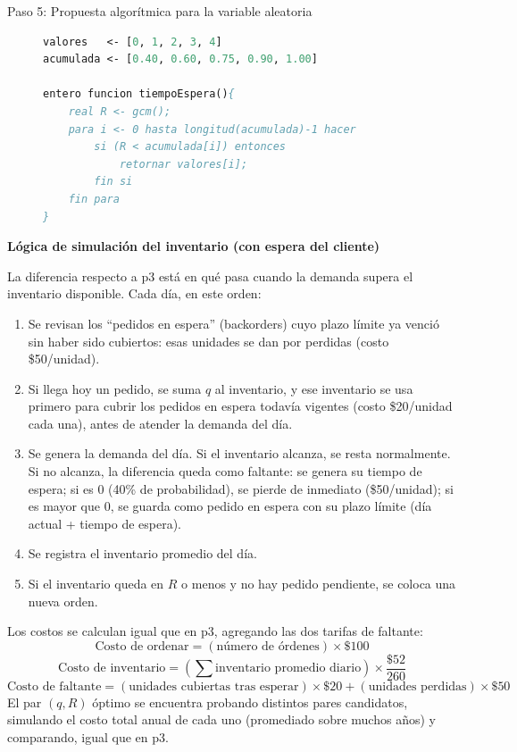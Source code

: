 \documentclass[12pt, a4paper]{article}
\begin{document}
\begin{description}
    \item[Paso 5: Propuesta algorítmica para la variable aleatoria]

    \begin{lstlisting}[caption={tiempoEspera()}, language=Pascal]
valores   <- [0, 1, 2, 3, 4]
acumulada <- [0.40, 0.60, 0.75, 0.90, 1.00]

entero funcion tiempoEspera(){
    real R <- gcm();
    para i <- 0 hasta longitud(acumulada)-1 hacer
        si (R < acumulada[i]) entonces
            retornar valores[i];
        fin si
    fin para
}
    \end{lstlisting}
\end{description}

\textbf{Lógica de simulación del inventario (con espera del cliente)}

La diferencia respecto a p3 está en qué pasa cuando la demanda supera el inventario disponible. Cada día, en este orden:
\begin{enumerate}
    \item Se revisan los ``pedidos en espera'' (backorders) cuyo plazo límite ya venció sin haber sido cubiertos: esas unidades se dan por perdidas (costo \$50/unidad).
    \item Si llega hoy un pedido, se suma $q$ al inventario, y ese inventario se usa primero para cubrir los pedidos en espera todavía vigentes (costo \$20/unidad cada una), antes de atender la demanda del día.
    \item Se genera la demanda del día. Si el inventario alcanza, se resta normalmente. Si no alcanza, la diferencia queda como faltante: se genera su tiempo de espera; si es 0 (40\% de probabilidad), se pierde de inmediato (\$50/unidad); si es mayor que 0, se guarda como pedido en espera con su plazo límite (día actual + tiempo de espera).
    \item Se registra el inventario promedio del día.
    \item Si el inventario queda en $R$ o menos y no hay pedido pendiente, se coloca una nueva orden.
\end{enumerate}

Los costos se calculan igual que en p3, agregando las dos tarifas de faltante:
\[
\text{Costo de ordenar} = (\text{n\'umero de \'ordenes}) \times \$100
\]
\[
\text{Costo de inventario} = \left(\sum \text{inventario promedio diario}\right) \times \frac{\$52}{260}
\]
\[
\text{Costo de faltante} = (\text{unidades cubiertas tras esperar}) \times \$20 + (\text{unidades perdidas}) \times \$50
\]
El par $(q,R)$ óptimo se encuentra probando distintos pares candidatos, simulando el costo total anual de cada uno (promediado sobre muchos años) y comparando, igual que en p3.
\end{document}
